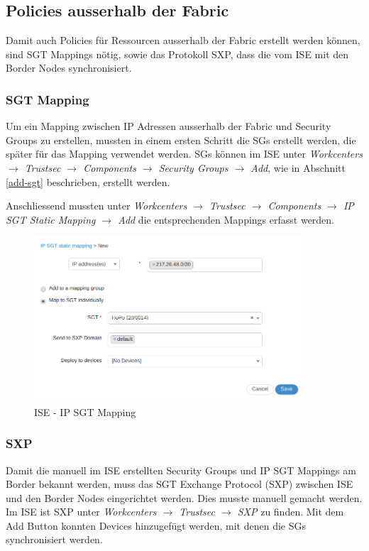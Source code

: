 \subsection{Policies ausserhalb der Fabric}

Damit auch Policies für Ressourcen ausserhalb der Fabric erstellt werden können, sind SGT Mappings nötig, sowie das Protokoll SXP, dass die vom ISE mit den Border Nodes synchronisiert.

\subsubsection{SGT Mapping}
Um ein Mapping zwischen IP Adressen ausserhalb der Fabric und Security Groups zu erstellen, mussten in einem ersten Schritt die SGs erstellt werden, die später für das Mapping verwendet werden. SGs können im ISE unter \textit{Workcenters $\rightarrow$ Trustsec $\rightarrow$ Components $\rightarrow$ Security Groups $\rightarrow$ Add}, wie in Abschnitt \ref{add-sgt} beschrieben, erstellt werden.

Anschliessend mussten unter \textit{Workcenters $\rightarrow$ Trustsec $\rightarrow$ Components $\rightarrow$ IP SGT Static Mapping $\rightarrow$ Add} die entsprechenden Mappings erfasst werden.

\begin{figure}[H]
	\centering
	\includegraphics[width=10cm]{img/secondtry/ise-sgt-mapping.png}
	\caption{ISE - IP SGT Mapping}
	\label{fig:ise-ip-sgt-mapping}
\end{figure}

\subsubsection{SXP}

Damit die manuell im ISE erstellten Security Groups und IP SGT Mappings am Border bekannt werden, muss das SGT Exchange Protocol (SXP) zwischen ISE und den Border Nodes eingerichtet werden. Dies musste manuell gemacht werden.
Im ISE ist SXP unter \textit{Workcenters $\rightarrow$ Trustsec $\rightarrow$ SXP} zu finden. Mit dem Add Button konnten Devices hinzugefügt werden, mit denen die SGs synchronisiert werden.

